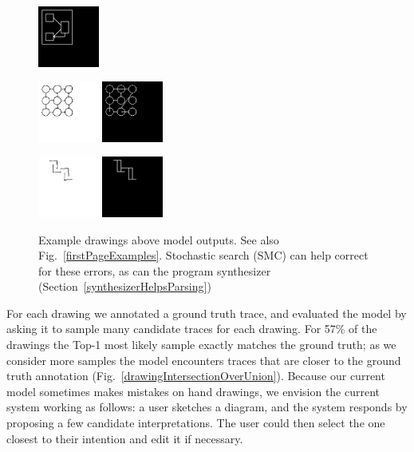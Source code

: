\documentclass{article}
\newcommand{\remark}[1]{\textcolor{red}{[#1]}}
\begin{document}
\begin{figure}[H]
\begin{minipage}[t]{2.25cm}
    \includegraphics[width = 2cm]{figures/0-parse.png}    
  \end{minipage}
  \begin{minipage}[t]{2.25cm}
    \includegraphics[width = 2cm]{figures/expert-38.png}
    \includegraphics[width = 2cm]{figures/38-parse.png}    
  \end{minipage}
  \begin{minipage}[t]{2.25cm}
    \includegraphics[width = 2cm]{figures/expert-34.png}
    \includegraphics[width = 2cm]{figures/34-parse.png}     
    \end{minipage}
  \caption{Example drawings above model outputs. See also Fig.~\ref{firstPageExamples}. Stochastic search (SMC) can help correct for these errors, as can the program synthesizer (Section~\ref{synthesizerHelpsParsing})}\label{lotsOfHandDrawings}%
\end{figure}
For each drawing we annotated a ground truth trace, and evaluated the
model by asking it to sample many candidate traces for each drawing.
For 57\% of the drawings the Top-1 most likely sample exactly matches the
ground truth; as we consider more samples the model encounters traces
that are closer to the ground truth annotation (Fig.~\ref{drawingIntersectionOverUnion}).
Because our current model sometimes makes mistakes on hand drawings,
we envision the current system working as follows:
a user sketches a diagram,
and the system responds by proposing a few candidate interpretations.
The user could then select the one closest to their intention and edit it if necessary.
\end{document}
